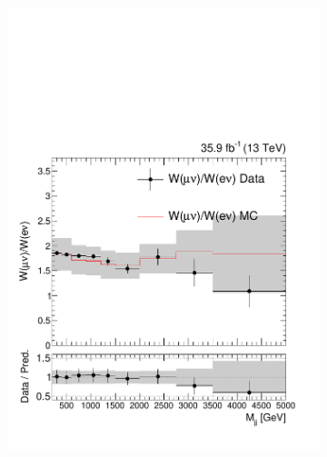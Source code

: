 \begin{figure}[]
\begin{center}
\begin{subfigure}[t]{0.32\textwidth}
            \includegraphics[width=\textwidth]{figures/vbf/fits/singlemuon_singleelectron_cat_vbf_ratio.pdf}
        \end{subfigure}
        \begin{subfigure}[t]{0.32\textwidth}

\end{subfigure}
\end{center}
\end{figure}
